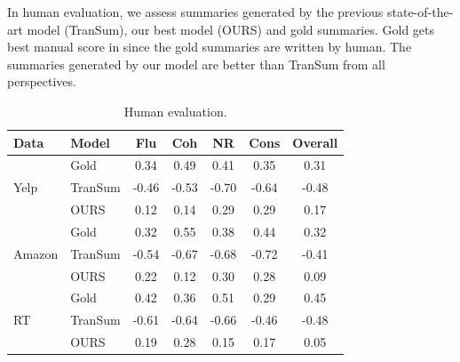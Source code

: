 \begin{table}[th]
	\caption{Generated summaries and their gold summary from Yelp. Bolded words are aspects. The sentences in red don't match Gold summary. The italicized sentences are ISs. %
	}			\label{tab:overall_exp}  
\end{table}




In human evaluation, we assess summaries generated by the previous state-of-the-art model (TranSum), our best model (OURS) and gold summaries.
Gold gets best manual score in 
since the gold summaries are written by human.
The summaries generated by our model 
are better than TranSum from all perspectives.
\begin{table}[th]
	\centering
	\scriptsize
	\begin{tabular}{|l|l|ccccc|}
		\hline
		\bf Data & \bf Model & \bf Flu & \bf Coh & \bf NR & \bf Cons & \bf Overall \\
		\hline
		\multirow{3}{*}{Yelp}&Gold& 0.34 & 0.49 & 0.41 & 0.35 & 0.31 \\
		&TranSum& -0.46 & -0.53 & -0.70& -0.64& -0.48 \\
		&OURS & 0.12 & 0.14 & 0.29 & 0.29 & 0.17 \\
		\hline
		\multirow{3}{*}{Amazon}&Gold& 0.32 & 0.55 & 0.38& 0.44 & 0.32\\
		&TranSum& -0.54 & -0.67 & -0.68 &-0.72 & -0.41 \\
		&OURS & 0.22 & 0.12 & 0.30 & 0.28 & 0.09 \\
		\hline
		\multirow{3}{*}{RT}&Gold& 0.42 & 0.36 & 0.51 & 0.29 & 0.45 \\
		&TranSum& -0.61 & -0.64 & -0.66 &-0.46 & -0.48 \\
		&OURS & 0.19 & 0.28 & 0.15 & 0.17 &  0.05 \\
		\hline
	\end{tabular}
	\caption{Human evaluation. }
	\label{tab:human}
\end{table}

